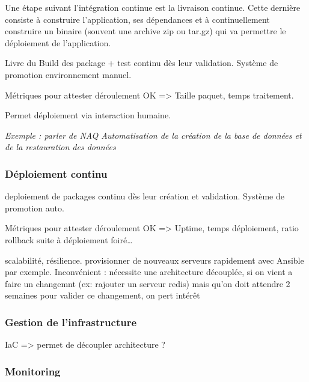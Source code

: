 
Une étape suivant l'intégration continue est la livraison continue. Cette dernière consiste à construire l'application, ses dépendances et à continuellement construire un binaire (souvent une archive zip ou tar.gz) qui va permettre le déploiement de l'application.

Livre du Build des package + test continu dès leur validation. Système de promotion environnement manuel.

Métriques pour attester déroulement OK => Taille paquet, temps traitement. 

Permet déploiement via interaction humaine.

\textit{Exemple : parler de NAQ Automatisation de la création de la base de données et de la restauration des données}

\subsubsection{Déploiement continu}


deploiement de packages continu dès leur création et validation. Système de promotion auto.

Métriques pour attester déroulement OK => Uptime, temps déploiement, ratio rollback suite à déploiement foiré\ldots

scalabilité, résilience. provisionner de nouveaux serveurs rapidement avec Ansible par exemple. Inconvénient : nécessite une architecture découplée, si on vient a faire un changemnt (ex: rajouter un serveur redis) mais qu'on doit attendre 2 semaines pour valider ce changement, on pert intérêt

\subsubsection{Gestion de l'infrastructure}


\gls{IaC} => permet de découpler architecture ? %


\subsubsection{Monitoring}

